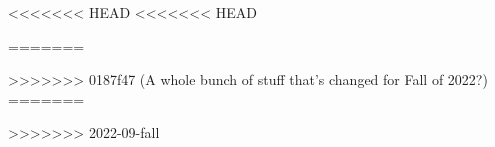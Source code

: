 \author[TML]{Dr.\ Timothy Leung}
<<<<<<< HEAD
<<<<<<< HEAD
\date{Updated: Summer 2022}
=======
\date{Fall 2022}
>>>>>>> 0187f47 (A whole bunch of stuff that's changed for Fall of 2022?)
=======
\date{Fall 2022}
>>>>>>> 2022-09-fall
